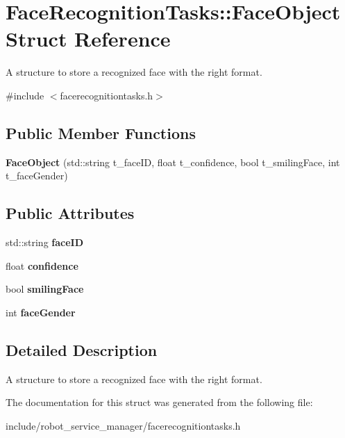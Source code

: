 \hypertarget{struct_face_recognition_tasks_1_1_face_object}{}\section{Face\+Recognition\+Tasks\+:\+:Face\+Object Struct Reference}
\label{struct_face_recognition_tasks_1_1_face_object}


A structure to store a recognized face with the right format.  




{\ttfamily \#include $<$facerecognitiontasks.\+h$>$}

\subsection*{Public Member Functions}
\begin{DoxyCompactItemize}
\item 
{\bfseries Face\+Object} (std\+::string t\+\_\+face\+ID, float t\+\_\+confidence, bool t\+\_\+smiling\+Face, int t\+\_\+face\+Gender)\hypertarget{struct_face_recognition_tasks_1_1_face_object_a40c0a24e85adc8456687ad800080a57a}{}\label{struct_face_recognition_tasks_1_1_face_object_a40c0a24e85adc8456687ad800080a57a}

\end{DoxyCompactItemize}
\subsection*{Public Attributes}
\begin{DoxyCompactItemize}
\item 
std\+::string {\bfseries face\+ID}\hypertarget{struct_face_recognition_tasks_1_1_face_object_a660dc6b7a26d51947702dad3cbe5e8d8}{}\label{struct_face_recognition_tasks_1_1_face_object_a660dc6b7a26d51947702dad3cbe5e8d8}

\item 
float {\bfseries confidence}\hypertarget{struct_face_recognition_tasks_1_1_face_object_acbec767a42191e33929561bf2ce22a74}{}\label{struct_face_recognition_tasks_1_1_face_object_acbec767a42191e33929561bf2ce22a74}

\item 
bool {\bfseries smiling\+Face}\hypertarget{struct_face_recognition_tasks_1_1_face_object_a8a388cd1c565068cd8f5a311fcb62759}{}\label{struct_face_recognition_tasks_1_1_face_object_a8a388cd1c565068cd8f5a311fcb62759}

\item 
int {\bfseries face\+Gender}\hypertarget{struct_face_recognition_tasks_1_1_face_object_a970b87a891878dadc24d1234fbf7240f}{}\label{struct_face_recognition_tasks_1_1_face_object_a970b87a891878dadc24d1234fbf7240f}

\end{DoxyCompactItemize}


\subsection{Detailed Description}
A structure to store a recognized face with the right format. 

The documentation for this struct was generated from the following file\+:\begin{DoxyCompactItemize}
\item 
include/robot\+\_\+service\+\_\+manager/facerecognitiontasks.\+h\end{DoxyCompactItemize}
